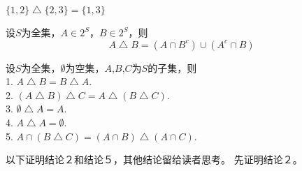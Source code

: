     \begin{Example}
        $\{1,2\} \bigtriangleup \{2,3\} = \{1,3\}$
      \end{Example}

      \begin{Thm}
        设$S$为全集，$A\in 2^S$，$B\in 2^S$，则
        \begin{equation*}
          A \bigtriangleup B = (A \cap B^c)\cup (A^c \cap B)
        \end{equation*}
      \end{Thm}
  \begin{Thm}
设$S$为全集，$\emptyset$为空集，$A$,$B$,$C$为$S$的子集，则\\
1. $A \bigtriangleup B = B \bigtriangleup A$.\\
2. $(A \bigtriangleup B) \bigtriangleup C = A \bigtriangleup (B \bigtriangleup C)$.\\
3. $\emptyset \bigtriangleup A = A$.\\
4. $A \bigtriangleup A = \emptyset$.\\
5. $A \cap (B \bigtriangleup C) = (A \cap B) \bigtriangleup (A \cap C)$.\\ 
  \end{Thm}

 以下证明结论２和结论５，其他结论留给读者思考。 先证明结论２。

